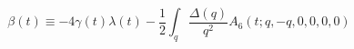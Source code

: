 \begin{equation}
\beta (t) \equiv - 4 \gamma (t) \lambda (t) - \frac{1}{2}
\int_q \frac{\Delta (q)}{q^2} A_6 (t; q,-q,0,0,0,0) \label{defbeta}
\end{equation}

